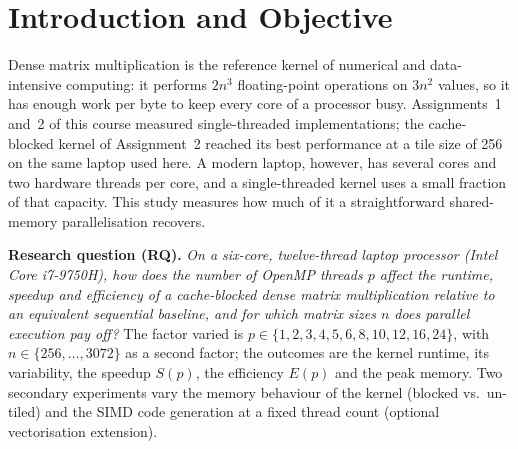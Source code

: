 \documentclass[conference,a4paper]{IEEEtran}
\begin{document}
\section{Introduction and Objective}
\label{sec:intro}
Dense matrix multiplication is the reference kernel of numerical and data-intensive computing: it
performs $2n^3$ floating-point operations on $3n^2$ values, so it has enough work per byte to keep
every core of a processor busy. Assignments~1 and~2 of this course measured single-threaded
implementations; the cache-blocked kernel of Assignment~2 reached its best performance at a
tile size of 256 on the same laptop used here. A modern laptop, however, has several cores and two
hardware threads per core, and a single-threaded kernel uses a small fraction of that capacity.
This study measures how much of it a straightforward shared-memory parallelisation recovers.

\textbf{Research question (RQ).} \emph{On a six-core, twelve-thread laptop processor
(Intel Core i7-9750H), how does the number of OpenMP threads $p$ affect the runtime, speedup and
efficiency of a cache-blocked dense matrix multiplication relative to an equivalent sequential
baseline, and for which matrix sizes $n$ does parallel execution pay off?} The factor varied is
$p\in\{1,2,3,4,5,6,8,10,12,16,24\}$, with $n\in\{256,\dots,3072\}$ as a second factor; the outcomes
are the kernel runtime, its variability, the speedup $S(p)$, the efficiency $E(p)$ and the peak memory.
Two secondary experiments vary the memory behaviour of the kernel (blocked vs.\ un-tiled) and the
SIMD code generation at a fixed thread count (optional vectorisation extension).
\end{document}
